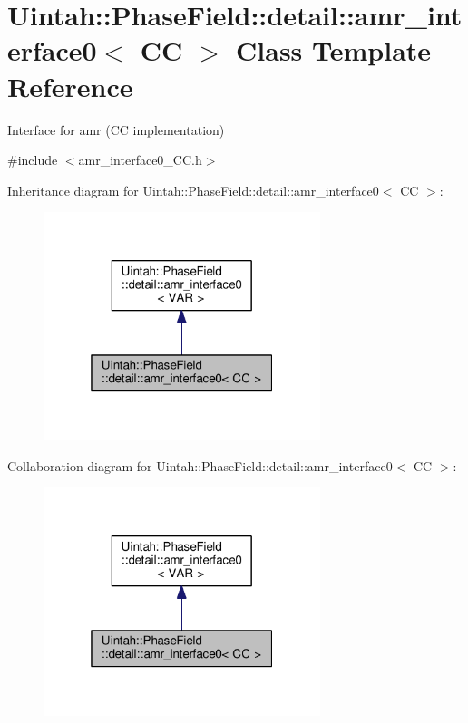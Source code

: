 \hypertarget{classUintah_1_1PhaseField_1_1detail_1_1amr__interface0_3_01CC_01_4}{}\section{Uintah\+:\+:Phase\+Field\+:\+:detail\+:\+:amr\+\_\+interface0$<$ CC $>$ Class Template Reference}
\label{classUintah_1_1PhaseField_1_1detail_1_1amr__interface0_3_01CC_01_4}


Interface for amr (CC implementation)  




{\ttfamily \#include $<$amr\+\_\+interface0\+\_\+\+C\+C.\+h$>$}



Inheritance diagram for Uintah\+:\+:Phase\+Field\+:\+:detail\+:\+:amr\+\_\+interface0$<$ CC $>$\+:\nopagebreak
\begin{figure}[H]
\begin{center}
\leavevmode
\includegraphics[width=229pt]{classUintah_1_1PhaseField_1_1detail_1_1amr__interface0_3_01CC_01_4__inherit__graph}
\end{center}
\end{figure}


Collaboration diagram for Uintah\+:\+:Phase\+Field\+:\+:detail\+:\+:amr\+\_\+interface0$<$ CC $>$\+:\nopagebreak
\begin{figure}[H]
\begin{center}
\leavevmode
\includegraphics[width=229pt]{classUintah_1_1PhaseField_1_1detail_1_1amr__interface0_3_01CC_01_4__coll__graph}
\end{center}
\end{figure}
